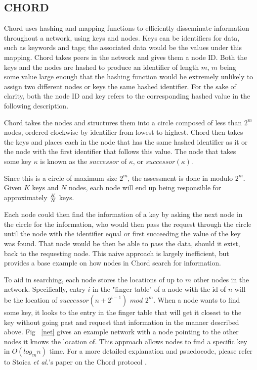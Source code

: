 \documentclass[10pt, conference, compsocconf, letterpaper]{IEEEtran}
\begin{document}
\subsection{CHORD}
Chord uses hashing and mapping functions to efficiently disseminate information throughout a network, using keys and nodes.  Keys can be identifiers for data, such as keywords and tags; the associated data would be the values under this mapping.  Chord takes peers in the network and gives them a node ID.  Both the keys and the nodes are hashed to produce an identifier of length $m$, $m$ being some value large enough that the hashing function would be extremely unlikely to assign two different nodes or keys the same hashed identifier.  For the sake of clarity, both the node ID and key refers to the corresponding hashed value in the following description.

Chord takes the nodes and structures them into a circle composed of less than $2^m$ nodes, ordered clockwise by identifier from lowest to highest.  Chord then takes the keys and places each in the node that has the same hashed identifier as it or the node with the first identifier that follows this value.  The node that takes some key $\kappa$ is known as the $successor$ of $\kappa$, or $successor(\kappa)$.  

Since this is a circle of maximum size $2^m$, the assessment is done in modulo $2^m$.  Given $K$ keys and $N$ nodes, each node will end up being responsible for approximately \(K\over N\) keys.

Each node could then find  the information of a key by asking the next node in the circle for the information, who would then pass the request through the circle until the node with the identifier equal or first succeeding the value of the key was found.  That node would be then be able to pass the data, should it exist, back to the requesting node.  This naive approach is largely inefficient, but provides a base example on how nodes in Chord search for information.

To aid in searching, each node stores the locations of up to $m$ other nodes in the network.  Specifically, entry $i$ in the "finger table" of a node with the id of $n$ will be the location of $successor(n+2^{i-1})$ $mod$ $2^m$. When a node wants to find some key, it looks to the entry in the finger table that will get it closest to the key without going past and request that information in the manner described above.  Fig ~\ref{net} \cite{Chordpic} gives an example network with a node pointing to the other nodes it knows the location of. This approach allows nodes to find a specific key in $O(log_mn)$ time.  For a more detailed explanation and psuedocode, please refer to Stoica \emph{et al.}'s paper on the Chord protocol \cite{Chord}.
\end{document}
